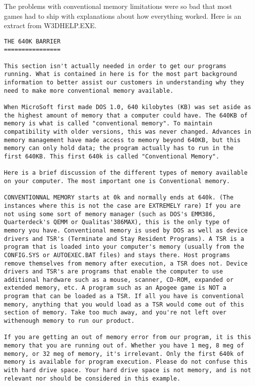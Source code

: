 \documentclass[book.tex]{subfiles}
\begin{document}
The problems with conventional memory limitations were so bad that most games had to ship with explanations about how everything worked. Here is an extract from W3DHELP.EXE.\\

 
   \begin{lstlisting}[breaklines=true,breakindent=0em]
THE 640K BARRIER
================

This section isn't actually needed in order to get our programs running. What is contained in here is for the most part background information to better assist our customers in understanding why they need to make more conventional memory available.

When MicroSoft first made DOS 1.0, 640 kilobytes (KB) was set aside as the highest amount of memory that a computer could have. The 640KB of memory is what is called "conventional memory". To maintain compatibility with older versions, this was never changed. Advances in memory management have made access to memory beyond 640KB, but this memory can only hold data; the program actually has to run in the first 640KB. This first 640k is called "Conventional Memory".

Here is a brief discussion of the different types of memory available on your computer. The most important one is Conventional memory.

CONVENTIONNAL MEMORY starts at 0k and normally ends at 640k. (The instances where this is not the case are EXTREMELY rare) If you are not using some sort of memory manager (such as DOS's EMM386, Quarterdeck's QEMM or Qualitas'386MAX), this is the only type of memory you have. Conventional memory is used by DOS as well as device drivers and TSR's (Terminate and Stay Resident Programs). A TSR is a program that is loaded into your computer's memory (usually from the CONFIG.SYS or AUTOEXEC.BAT files) and stays there. Host programs remove themselves from memory after execution, a TSR does not. Device drivers and TSR's are programs that enable the computer to use additional hardware such as a mouse, scanner, CD-ROM, expanded or extended memory, etc. A program such as an Apogee game is NOT a program that can be loaded as a TSR. If all you have is conventional memory, anything that you would load as a TSR would come out of this section of memory. Take too much away, and you're not left over withenough memory to run our product. 

If you are getting an out of memory error from our program, it is this memory that you are running out of. Whether you have 1 meg, 8 meg of memory, or 32 meg of memory, it's irrelevant. Only the first 640k of memory is available for program execution. Please do not confuse this with hard drive space. Your hard drive space is not memory, and is not relevant nor should be considered in this example.


\end{lstlisting}
\end{document}

